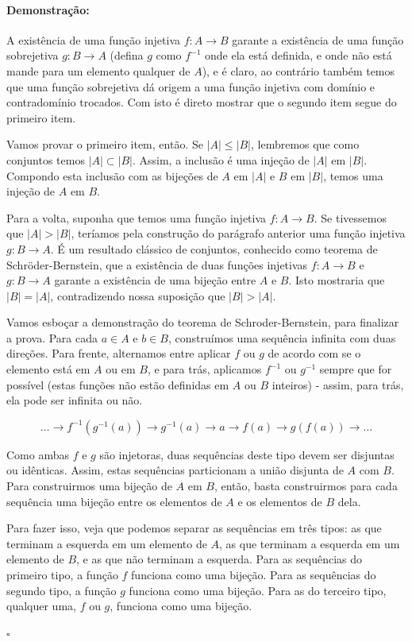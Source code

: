 \documentclass[11pt]{article}
\newcommand{\pulinho}{\vspace{.5cm}}
\theoremstyle{definition}
\theoremstyle{definition}
\theoremstyle{definition}
\theoremstyle{definition}
\theoremstyle{definition}
\theoremstyle{definition}
\theoremstyle{definition}
\theoremstyle{definition}
\theoremstyle{definition}
\theoremstyle{definition}
\theoremstyle{definition}
\theoremstyle{definition}
\newenvironment{prova}{\paragraph{Demonstração:}}{\hfill$\square$ 
\pulinho
}
\theoremstyle{definition}
\begin{document}
\begin{prova}
  A existência de uma função injetiva $f: A \rightarrow B$ garante a existência de uma função sobrejetiva $g: B \rightarrow A$ (defina $g$ como $f^{-1}$ onde ela está definida, e onde não está mande para um elemento qualquer de $A$), e é claro, ao contrário também temos que uma função sobrejetiva dá origem a uma função injetiva com domínio e contradomínio trocados. Com isto é direto mostrar que o segundo item segue do primeiro item.

  Vamos provar o primeiro item, então. Se $|A| \leq |B|$, lembremos que como conjuntos temos $|A| \subset |B|$. Assim, a inclusão é uma injeção de $|A|$ em $|B|$. Compondo esta inclusão com as bijeções de $A$ em $|A|$ e $B$ em $|B|$, temos uma injeção de $A$ em $B$.

  Para a volta, suponha que temos uma função injetiva $f: A \rightarrow B$. Se tivessemos que $|A| > |B|$, teríamos pela construção do parágrafo anterior uma função injetiva $g: B \rightarrow A$. É um resultado clássico de conjuntos, conhecido como teorema de Schröder-Bernstein, que a existência de duas funções injetivas $f: A \rightarrow B$ e $g: B \rightarrow A$ garante a existência de uma bijeção entre $A$ e $B$. Isto mostraria que $|B| = |A|$, contradizendo nossa suposição que $|B| > |A|$.

  Vamos esboçar a demonstração do teorema de Schroder-Bernstein, para finalizar a prova. Para cada $a \in A$ e $b \in B$, construímos uma sequência infinita com duas direções. Para frente, alternamos entre aplicar $f$ ou $g$ de acordo com se o elemento está em $A$ ou em $B$, e para trás, aplicamos $f^{-1}$ ou $g^{-1}$ sempre que for possível (estas funções não estão definidas em $A$ ou $B$ inteiros) - assim, para trás, ela pode ser infinita ou não.

  \[
  \dots \rightarrow f^{-1}(g^{-1}(a)) \rightarrow g^{-1}(a) \rightarrow a \rightarrow f(a) \rightarrow g(f(a)) \rightarrow \dots
  \]

  Como ambas $f$ e $g$ são injetoras, duas sequências deste tipo devem ser disjuntas ou idênticas. Assim, estas sequências particionam a união disjunta de $A$ com $B$. Para construirmos uma bijeção de $A$ em $B$, então, basta construirmos para cada sequência uma bijeção entre os elementos de $A$ e os elementos de $B$ dela. 
  
  Para fazer isso, veja que podemos separar as sequências em três tipos: as que terminam a esquerda em um elemento de $A$, as que terminam a esquerda em um elemento de $B$, e as que não terminam a esquerda. Para as sequências do primeiro tipo, a função $f$ funciona como uma bijeção. Para as sequências do segundo tipo, a função $g$ funciona como uma bijeção. Para as do terceiro tipo, qualquer uma, $f$ ou $g$, funciona como uma bijeção.

\end{prova}
\end{document}
